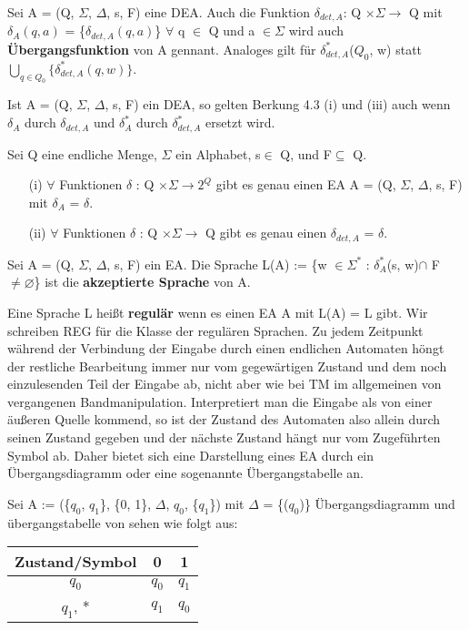 Sei A = (Q, $\Sigma$,  $\Delta$, s, F) eine DEA. Auch die Funktion $\delta_{det, A}$: Q $\times \Sigma \rightarrow$ Q mit $\delta_{A}(q,a)$ = \{$\delta_{det, A}(q, a)$\} $\forall$ q $\in$ Q und a $\in \Sigma$ wird auch \textbf{Übergangsfunktion} von A gennant. Analoges gilt für $\delta_{det, A}^{*}$($Q_{0}$, w) statt $\bigcup \limits_{q \in Q_{0}}\{\delta_{det, A}^{*}(q, w)\}$.

Ist A = (Q, $\Sigma$, $\Delta$, s, F) ein DEA, so gelten Berkung 4.3 (i) und (iii) auch wenn $\delta_{A}$ durch $\delta_{det, A}$ und $\delta_{A}^{*}$ durch $\delta_{det, A}^{*}$ ersetzt wird.

Sei Q eine endliche Menge, $\Sigma$ ein Alphabet, s$\in$ Q, und F$\subseteq$ Q. 

\begin{itemize}
    \item [(i)] $\forall$ Funktionen $\delta$ : Q $\times \Sigma \rightarrow 2^{Q}$ gibt es genau einen EA A = (Q, $\Sigma$, $\Delta$, s, F) mit $\delta_{A}$ = $\delta$.
    \item [(ii)] $\forall$ Funktionen $\delta$ : Q $\times \Sigma \rightarrow$ Q gibt es genau einen $\delta_{det, A}$ = $\delta$. 
\end{itemize}

Sei A = (Q, $\Sigma$, $\Delta$, s, F) ein EA. Die Sprache L(A) := \{w $\in \Sigma^{*}$ : $\delta_{A}^{*}$(s, w)$\cap$ F $\neq \varnothing $\} ist die \textbf{akzeptierte Sprache} von A.

Eine Sprache L heißt \textbf{regulär} wenn es einen EA A mit L(A) = L gibt. Wir schreiben REG für die Klasse der regulären Sprachen. Zu jedem Zeitpunkt während der Verbindung der Eingabe durch einen endlichen Automaten höngt der restliche Bearbeitung immer nur vom gegewärtigen Zustand und dem noch einzulesenden Teil der Eingabe ab, nicht aber wie bei TM im allgemeinen von vergangenen Bandmanipulation. Interpretiert man die Eingabe als von einer äußeren Quelle kommend, so ist der  Zustand des Automaten also allein durch seinen Zustand gegeben und der nächste Zustand hängt nur vom Zugeführten Symbol ab. Daher bietet sich eine Darstellung eines EA durch ein Übergangsdiagramm oder eine sogenannte Übergangstabelle an.

\newpage
{}
Sei A := (\{$q_{0}$, $q_{1}$\}, \{0, 1\}, $\Delta$, $q_{0}$, \{$q_{1}$\}) mit $\Delta$ = \{($q_{0}$)\}
Übergangsdiagramm und übergangstabelle von sehen wie folgt aus:
\begin{center}
    \begin{tabular}{|c|c|c|}
        \hline
        \textbf{Zustand/Symbol} & \textbf{0} & \textbf{1} \\
        \hline
        $q_{0}$ & $q_{0}$ & $q_{1}$ \\
        \hline
        $q_{1}$, * & $q_{1}$ & $q_{0}$ \\
        \hline
    \end{tabular}
\end{center}

